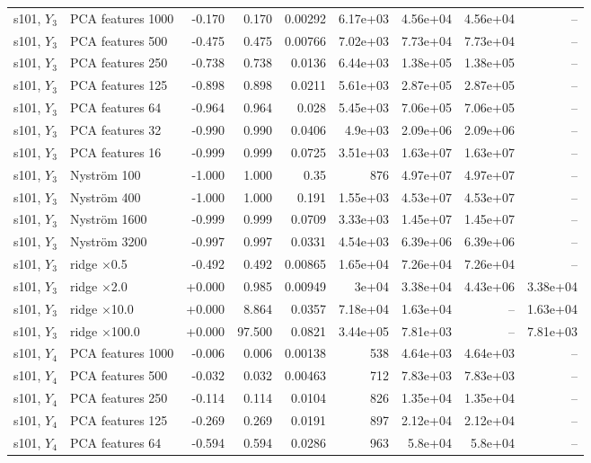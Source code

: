 \begin{landscape}
{\begin{longtable}{llrrrrrrr}
s101, $Y_3$ & PCA features 1000 & -0.170 & 0.170 & 0.00292 & 6.17e+03 & 4.56e+04 & 4.56e+04 & -- \\
s101, $Y_3$ & PCA features 500 & -0.475 & 0.475 & 0.00766 & 7.02e+03 & 7.73e+04 & 7.73e+04 & -- \\
s101, $Y_3$ & PCA features 250 & -0.738 & 0.738 & 0.0136 & 6.44e+03 & 1.38e+05 & 1.38e+05 & -- \\
s101, $Y_3$ & PCA features 125 & -0.898 & 0.898 & 0.0211 & 5.61e+03 & 2.87e+05 & 2.87e+05 & -- \\
s101, $Y_3$ & PCA features 64 & -0.964 & 0.964 & 0.028 & 5.45e+03 & 7.06e+05 & 7.06e+05 & -- \\
s101, $Y_3$ & PCA features 32 & -0.990 & 0.990 & 0.0406 & 4.9e+03 & 2.09e+06 & 2.09e+06 & -- \\
s101, $Y_3$ & PCA features 16 & -0.999 & 0.999 & 0.0725 & 3.51e+03 & 1.63e+07 & 1.63e+07 & -- \\
s101, $Y_3$ & Nystr\"om 100 & -1.000 & 1.000 & 0.35 & 876 & 4.97e+07 & 4.97e+07 & -- \\
s101, $Y_3$ & Nystr\"om 400 & -1.000 & 1.000 & 0.191 & 1.55e+03 & 4.53e+07 & 4.53e+07 & -- \\
s101, $Y_3$ & Nystr\"om 1600 & -0.999 & 0.999 & 0.0709 & 3.33e+03 & 1.45e+07 & 1.45e+07 & -- \\
s101, $Y_3$ & Nystr\"om 3200 & -0.997 & 0.997 & 0.0331 & 4.54e+03 & 6.39e+06 & 6.39e+06 & -- \\
s101, $Y_3$ & ridge $\times$0.5 & -0.492 & 0.492 & 0.00865 & 1.65e+04 & 7.26e+04 & 7.26e+04 & -- \\
s101, $Y_3$ & ridge $\times$2.0 & +0.000 & 0.985 & 0.00949 & 3e+04 & 3.38e+04 & 4.43e+06 & 3.38e+04 \\
s101, $Y_3$ & ridge $\times$10.0 & +0.000 & 8.864 & 0.0357 & 7.18e+04 & 1.63e+04 & -- & 1.63e+04 \\
s101, $Y_3$ & ridge $\times$100.0 & +0.000 & 97.500 & 0.0821 & 3.44e+05 & 7.81e+03 & -- & 7.81e+03 \\
s101, $Y_4$ & PCA features 1000 & -0.006 & 0.006 & 0.00138 & 538 & 4.64e+03 & 4.64e+03 & -- \\
s101, $Y_4$ & PCA features 500 & -0.032 & 0.032 & 0.00463 & 712 & 7.83e+03 & 7.83e+03 & -- \\
s101, $Y_4$ & PCA features 250 & -0.114 & 0.114 & 0.0104 & 826 & 1.35e+04 & 1.35e+04 & -- \\
s101, $Y_4$ & PCA features 125 & -0.269 & 0.269 & 0.0191 & 897 & 2.12e+04 & 2.12e+04 & -- \\
s101, $Y_4$ & PCA features 64 & -0.594 & 0.594 & 0.0286 & 963 & 5.8e+04 & 5.8e+04 & -- \\

\end{longtable}}
\end{landscape}
